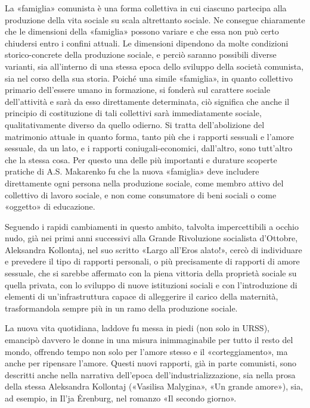 \documentclass[12pt,a4paper,openany]{book}
\begin{document}
La «famiglia» comunista è una forma collettiva in cui ciascuno partecipa alla produzione della vita sociale su scala altrettanto sociale. Ne consegue chiaramente che le dimensioni della «famiglia» possono variare e che essa non può certo chiudersi entro i confini attuali. Le dimensioni dipendono da molte condizioni storico-concrete della produzione sociale, e perciò saranno possibili diverse varianti, sia all'interno di una stessa epoca dello sviluppo della società comunista, sia nel corso della sua storia. Poiché una simile «famiglia», in quanto collettivo primario dell'essere umano in formazione, si fonderà sul carattere sociale dell'attività e sarà da esso direttamente determinata, ciò significa che anche il principio di costituzione di tali collettivi sarà immediatamente sociale, qualitativamente diverso da quello odierno. Si tratta dell'abolizione del matrimonio attuale in quanto forma, tanto più che i rapporti sessuali e l'amore sessuale, da un lato, e i rapporti coniugali-economici, dall'altro, sono tutt'altro che la stessa cosa. Per questo una delle più importanti e durature scoperte pratiche di A.S. Makarenko fu che la nuova «famiglia» deve includere direttamente ogni persona nella produzione sociale, come membro attivo del collettivo di lavoro sociale, e non come consumatore di beni sociali o come «oggetto» di educazione.

Seguendo i rapidi cambiamenti in questo ambito, talvolta impercettibili a occhio nudo, già nei primi anni successivi alla Grande Rivoluzione socialista d'Ottobre, Aleksandra Kollontaj, nel suo scritto «Largo all'Eros alato!», cercò di individuare e prevedere il tipo di rapporti personali, o più precisamente di rapporti di amore sessuale, che si sarebbe affermato con la piena vittoria della proprietà sociale su quella privata, con lo sviluppo di nuove istituzioni sociali e con l'introduzione di elementi di un'infrastruttura capace di alleggerire il carico della maternità, trasformandola sempre più in un ramo della produzione sociale.

La nuova vita quotidiana, laddove fu messa in piedi (non solo in URSS), emancipò davvero le donne in una misura inimmaginabile per tutto il resto del mondo, offrendo tempo non solo per l'amore stesso e il «corteggiamento», ma anche per ripensare l'amore. Questi nuovi rapporti, già in parte comunisti, sono descritti anche nella narrativa dell'epoca dell'industrializzazione, sia nella prosa della stessa Aleksandra Kollontaj («Vasilisa Malygina», «Un grande amore»), sia, ad esempio, in Il'ja Ėrenburg, nel romanzo «Il secondo giorno».
\end{document}
